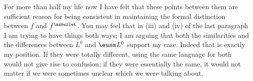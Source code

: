 {For more than half my life now I have felt that these points between
them are
sufficient reason for being consistent in maintaining
the formal distinction between $f$ and $f^{\ssbullet}$.   You may feel
that in (iii) and (iv) of the last paragraph I am trying to have things
both ways;  I am arguing that both the similarities and the differences
between $L^0$ and $\eusm L^0$ support my case.   Indeed that is
exactly my position.   If they were totally different, using the same
language for both would not give rise to confusion;  if they were
essentially the same, it would not matter if we were sometimes unclear
which we were talking about.
}%

\discrpage

